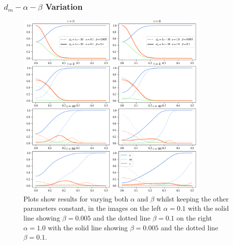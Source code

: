 \subsubsection*{$d_m - \alpha - \beta$ Variation}
\begin{figure}[h]
    \centering
    \includegraphics[width=0.85\textwidth]{resources/images/dm_alpha_beta_variation_1.png}
    \caption{Plots show results for varying both $\alpha$ and $\beta$ whilst keeping the other parameters constant, in the images on the left $\alpha=0.1$ with the solid line showing $\beta = 0.005$ and the dotted line $\beta=0.1$ on the right $\alpha=1.0$ with the solid line showing $\beta = 0.005$ and the dotted line $\beta=0.1$.}
    \label{fig:alpha_beta_variation}
\end{figure}
